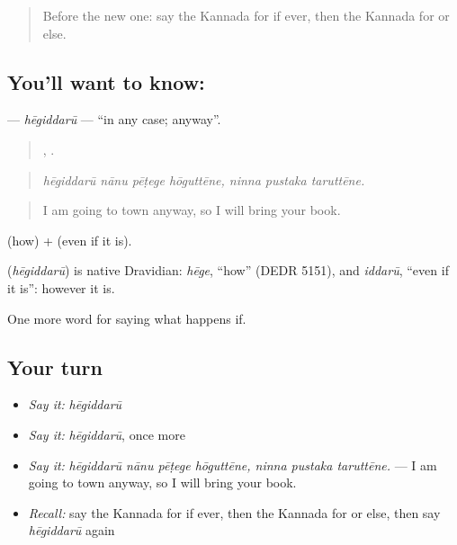 \label{lesson:KA-C428-hegiddaru}



\begin{quote}
Before the new one: say the Kannada for if ever, then the Kannada for or else.
\end{quote}

\subsection*{You'll want to know: }
\textbf{} — \emph{hēgiddarū} — \textquotedblleft{}in any case; anyway\textquotedblright{}.

\begin{quote}
   ,   .
\end{quote}

\begin{quote}
\emph{hēgiddarū nānu pēṭege hōguttēne, ninna pustaka taruttēne.}
\end{quote}

\begin{quote}
I am going to town anyway, so I will bring your book.
\end{quote}

 (how) +  (even if it is).

\begin{cousinweb}
\textbf{} (\emph{hēgiddarū}) is native Dravidian: \emph{hēge}, \textquotedblleft{}how\textquotedblright{} (DEDR 5151), and \emph{iddarū}, \textquotedblleft{}even if it is\textquotedblright{}: however it is.
\end{cousinweb}

\begin{grammarlens}[title={What you've built}]
One more word for saying what happens if.
\end{grammarlens}

\subsection*{Your turn}
\begin{itemize}
\raggedright
  \item \emph{Say it:} \emph{hēgiddarū}
  \item \emph{Say it:} \emph{hēgiddarū}, once more
  \item \emph{Say it:} \emph{hēgiddarū nānu pēṭege hōguttēne, ninna pustaka taruttēne.} — I am going to town anyway, so I will bring your book.
  \item \emph{Recall:} say the Kannada for if ever, then the Kannada for or else, then say \emph{hēgiddarū} again
\end{itemize}

